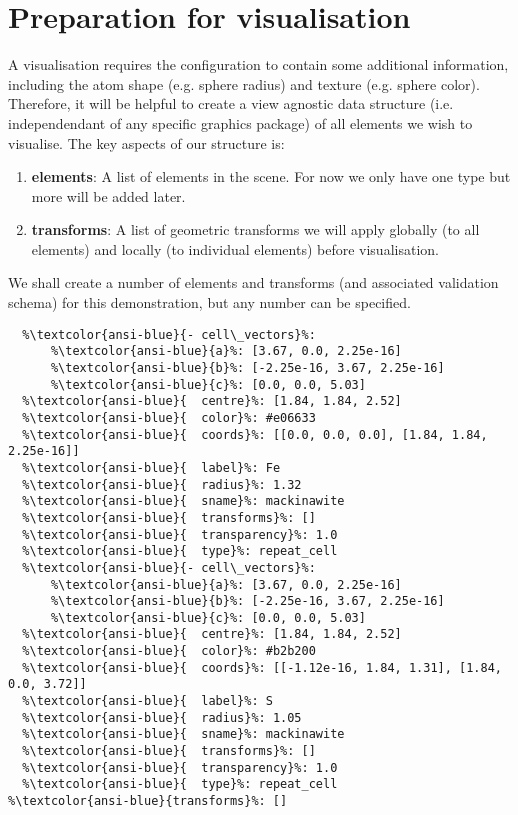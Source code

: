 \documentclass[10pt,parskip=half,
	toc=sectionentrywithdots,
	bibliography=totocnumbered,
	captions=tableheading,numbers=noendperiod]{scrartcl}
\providecommand{\tightlist}{%
  \setlength{\itemsep}{0pt}\setlength{\parskip}{0pt}}
\begin{document}
\section{Preparation for
visualisation}\label{preparation-for-visualisation}

A visualisation requires the configuration to contain some additional
information, including the atom shape (e.g. sphere radius) and texture
(e.g. sphere color). Therefore, it will be helpful to create a view
agnostic data structure (i.e. independendant of any specific graphics
package) of all elements we wish to visualise. The key aspects of our
structure is:

\begin{enumerate}
\def\labelenumi{\arabic{enumi}.}
\tightlist
\item
  \textbf{elements}: A list of elements in the scene. For now we only
  have one type but more will be added later.
\item
  \textbf{transforms}: A list of geometric transforms we will apply
  globally (to all elements) and locally (to individual elements) before
  visualisation.
\end{enumerate}

We shall create a number of elements and transforms (and associated
validation schema) for this demonstration, but any number can be
specified.

\begin{lstlisting}[language={},postbreak={},numbers=none,xrightmargin=7pt,belowskip=5pt,aboveskip=5pt,breakindent=0pt,escapechar=\%]
%\textcolor{ansi-blue}{elements}%: 
  %\textcolor{ansi-blue}{- cell\_vectors}%: 
      %\textcolor{ansi-blue}{a}%: [3.67, 0.0, 2.25e-16]
      %\textcolor{ansi-blue}{b}%: [-2.25e-16, 3.67, 2.25e-16]
      %\textcolor{ansi-blue}{c}%: [0.0, 0.0, 5.03]
  %\textcolor{ansi-blue}{  centre}%: [1.84, 1.84, 2.52]
  %\textcolor{ansi-blue}{  color}%: #e06633
  %\textcolor{ansi-blue}{  coords}%: [[0.0, 0.0, 0.0], [1.84, 1.84, 2.25e-16]]
  %\textcolor{ansi-blue}{  label}%: Fe
  %\textcolor{ansi-blue}{  radius}%: 1.32
  %\textcolor{ansi-blue}{  sname}%: mackinawite
  %\textcolor{ansi-blue}{  transforms}%: []
  %\textcolor{ansi-blue}{  transparency}%: 1.0
  %\textcolor{ansi-blue}{  type}%: repeat_cell
  %\textcolor{ansi-blue}{- cell\_vectors}%: 
      %\textcolor{ansi-blue}{a}%: [3.67, 0.0, 2.25e-16]
      %\textcolor{ansi-blue}{b}%: [-2.25e-16, 3.67, 2.25e-16]
      %\textcolor{ansi-blue}{c}%: [0.0, 0.0, 5.03]
  %\textcolor{ansi-blue}{  centre}%: [1.84, 1.84, 2.52]
  %\textcolor{ansi-blue}{  color}%: #b2b200
  %\textcolor{ansi-blue}{  coords}%: [[-1.12e-16, 1.84, 1.31], [1.84, 0.0, 3.72]]
  %\textcolor{ansi-blue}{  label}%: S
  %\textcolor{ansi-blue}{  radius}%: 1.05
  %\textcolor{ansi-blue}{  sname}%: mackinawite
  %\textcolor{ansi-blue}{  transforms}%: []
  %\textcolor{ansi-blue}{  transparency}%: 1.0
  %\textcolor{ansi-blue}{  type}%: repeat_cell
%\textcolor{ansi-blue}{transforms}%: []

\end{lstlisting}
\end{document}
